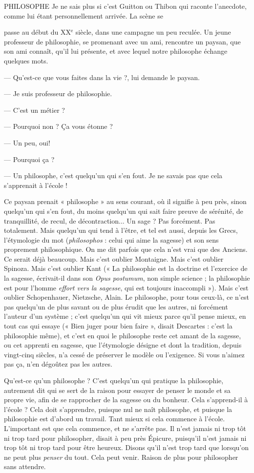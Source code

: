 PHILOSOPHE Je ne sais plus si c’est Guitton ou Thibon qui raconte l’anecdote,
comme lui étant personnellement arrivée. La scène se

passe au début du {\footnotesize XX$^\text{e}$} siècle, dans une campagne un peu reculée. Un jeune professeur
de philosophie, se promenant avec un ami, rencontre un paysan, que
son ami connaît, qu’il lui présente, et avec lequel notre philosophe échange
quelques mots.

— Qu'est-ce que vous faites dans la vie ?, lui demande le paysan.

— Je suis professeur de philosophie.

— C’est un métier ?

— Pourquoi non ? Ça vous étonne ?

— Un peu, oui!

— Pourquoi ça ?

— Un philosophe, c’est quelqu'un qui s’en fout. Je ne savais pas que cela
s’apprenait à l’école !

Ce paysan prenait « philosophe » au sens courant, où il signifie à peu près,
sinon quelqu'un qui s’en fout, du moins quelqu'un qui sait faire preuve de
sérénité, de tranquillité, de recul, de décontraction... Un sage ? Pas forcément.
Pas totalement. Mais quelqu’un qui tend à l'être, et tel est aussi, depuis les
Grecs, l’étymologie du mot ({\it philosophos} : celui qui aime la sagesse) et son sens
proprement philosophique. On me dit parfois que cela n’est vrai que des
Anciens. Ce serait déjà beaucoup. Mais c’est oublier Montaigne. Mais c’est
oublier Spinoza. Mais c’est oublier Kant (« La philosophie est la doctrine et
l'exercice de la sagesse, écrivait-il dans son {\it Opus postumum}, non simple
science ; la philosophie est pour l’homme {\it effort vers la sagesse}, qui est toujours
inaccompli »). Mais c’est oublier Schopenhauer, Nietzsche, Alain. Le philosophe,
pour tous ceux-là, ce n’est pas quelqu'un de plus savant ou de plus
érudit que les autres, ni forcément l’auteur d’un système ; c’est quelqu’un qui
vit mieux parce qu'il pense mieux, en tout cas qui essaye (« Bien juger pour
bien faire », disait Descartes : c’est la philosophie même), et c’est en quoi le
philosophe reste cet amant de la sagesse, ou cet apprenti en sagesse, que l’étymologie
désigne et dont la tradition, depuis vingt-cinq siècles, n’a cessé de préserver
le modèle ou l'exigence. Si vous n’aimez pas ça, n’en dégoûtez pas les
autres.

Qu'est-ce qu’un philosophe ? C’est quelqu'un qui pratique la philosophie,
autrement dit qui se sert de la raison pour essayer de penser le monde et sa
propre vie, afin de se rapprocher de la sagesse ou du bonheur. Cela s’apprend-il
à l'école ? Cela doit s’apprendre, puisque nul ne naît philosophe, et puisque
la philosophie est d’abord un travail. Tant mieux si cela commence à l’école.
L'important est que cela commence, et ne s'arrête pas. Il n’est jamais ni trop tôt
ni trop tard pour philosopher, disait à peu près Épicure, puisqu'il n’est jamais
ni trop tôt ni trop tard pour être heureux. Disons qu’il n’est trop tard que
lorsqu'on ne peut plus {\it penser} du tout. Cela peut venir. Raison de plus pour
philosopher sans attendre.

